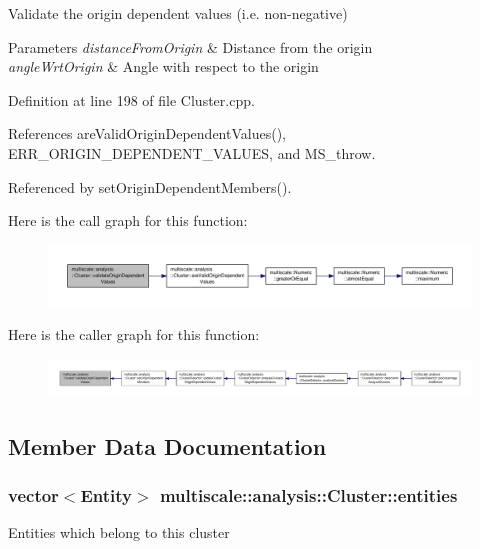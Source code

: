 Validate the origin dependent values (i.\-e. non-\/negative) 


\begin{DoxyParams}{Parameters}
{\em distance\-From\-Origin} & Distance from the origin \\
\hline
{\em angle\-Wrt\-Origin} & Angle with respect to the origin \\
\hline
\end{DoxyParams}


Definition at line 198 of file Cluster.\-cpp.



References are\-Valid\-Origin\-Dependent\-Values(), E\-R\-R\-\_\-\-O\-R\-I\-G\-I\-N\-\_\-\-D\-E\-P\-E\-N\-D\-E\-N\-T\-\_\-\-V\-A\-L\-U\-E\-S, and M\-S\-\_\-throw.



Referenced by set\-Origin\-Dependent\-Members().



Here is the call graph for this function\-:\nopagebreak
\begin{figure}[H]
\begin{center}
\leavevmode
\includegraphics[width=350pt]{classmultiscale_1_1analysis_1_1Cluster_a26b9c11e63bfdbfc837a35f68c5c40dd_cgraph}
\end{center}
\end{figure}




Here is the caller graph for this function\-:\nopagebreak
\begin{figure}[H]
\begin{center}
\leavevmode
\includegraphics[width=350pt]{classmultiscale_1_1analysis_1_1Cluster_a26b9c11e63bfdbfc837a35f68c5c40dd_icgraph}
\end{center}
\end{figure}




\subsection{Member Data Documentation}
\hypertarget{classmultiscale_1_1analysis_1_1Cluster_a820298479651328fb79d92a65f7923d6}{
\subsubsection[{entities}]{\setlength{\rightskip}{0pt plus 5cm}vector$<${\bf Entity}$>$ multiscale\-::analysis\-::\-Cluster\-::entities\hspace{0.3cm}{\ttfamily [private]}}}\label{classmultiscale_1_1analysis_1_1Cluster_a820298479651328fb79d92a65f7923d6}
Entities which belong to this cluster 

